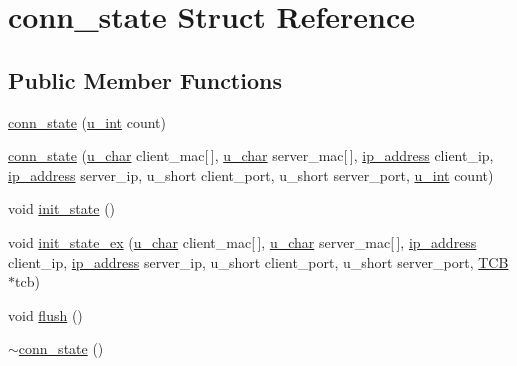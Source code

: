 \hypertarget{structconn__state}{\section{conn\-\_\-state \-Struct \-Reference}
\label{structconn__state}
}
\subsection*{\-Public \-Member \-Functions}
\begin{DoxyCompactItemize}
\item 
\hyperlink{structconn__state_a486fdccdd49599f23b06cc01ca908e51}{conn\-\_\-state} (\hyperlink{split__tcp__gateway_8h_ac319c165d52643e43249fe003e18bdf3}{u\-\_\-int} count)
\item 
\hyperlink{structconn__state_a75a622da71a9f0c3f7f7b04d4226dc90}{conn\-\_\-state} (\hyperlink{split__tcp__gateway_8h_ae2b02ed168fc99cff3851603910b1fb6}{u\-\_\-char} client\-\_\-mac\mbox{[}$\,$\mbox{]}, \hyperlink{split__tcp__gateway_8h_ae2b02ed168fc99cff3851603910b1fb6}{u\-\_\-char} server\-\_\-mac\mbox{[}$\,$\mbox{]}, \hyperlink{structip__address}{ip\-\_\-address} client\-\_\-ip, \hyperlink{structip__address}{ip\-\_\-address} server\-\_\-ip, u\-\_\-short client\-\_\-port, u\-\_\-short server\-\_\-port, \hyperlink{split__tcp__gateway_8h_ac319c165d52643e43249fe003e18bdf3}{u\-\_\-int} count)
\item 
void \hyperlink{structconn__state_a4d0eafa1824b5c9692b32f7935af3965}{init\-\_\-state} ()
\item 
void \hyperlink{structconn__state_a359ba7d038cee0577d2df72566a5db78}{init\-\_\-state\-\_\-ex} (\hyperlink{split__tcp__gateway_8h_ae2b02ed168fc99cff3851603910b1fb6}{u\-\_\-char} client\-\_\-mac\mbox{[}$\,$\mbox{]}, \hyperlink{split__tcp__gateway_8h_ae2b02ed168fc99cff3851603910b1fb6}{u\-\_\-char} server\-\_\-mac\mbox{[}$\,$\mbox{]}, \hyperlink{structip__address}{ip\-\_\-address} client\-\_\-ip, \hyperlink{structip__address}{ip\-\_\-address} server\-\_\-ip, u\-\_\-short client\-\_\-port, u\-\_\-short server\-\_\-port, \hyperlink{structTCB}{\-T\-C\-B} $\ast$tcb)
\item 
void \hyperlink{structconn__state_a401e6b50d8cf06875fb28023eb943473}{flush} ()
\item 
\hyperlink{structconn__state_aad98a251ec293031fb7ad73d5496a4ee}{$\sim$conn\-\_\-state} ()
\end{DoxyCompactItemize}

